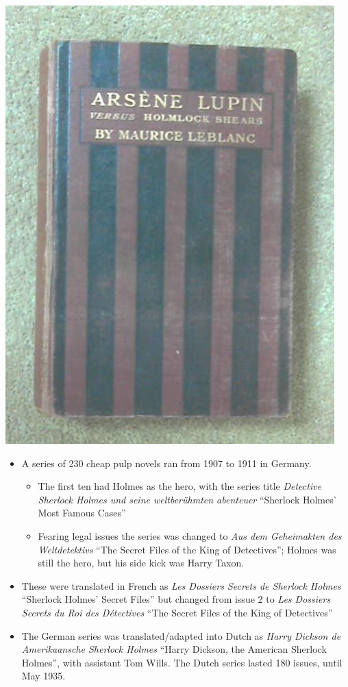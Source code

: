 \documentclass[a4paper,landscape,headrule,footrule,xetex]{foils}
\begin{document}
\includegraphics[height=0.7\textheight]{pics/lupi.jpg}



\begin{itemize}
\item A series of 230 cheap pulp novels ran from 1907 to 1911 in Germany.
  \begin{itemize}
  \item The first ten had Holmes as the hero, with the series title
    \textit{Detective Sherlock Holmes und seine weltberühmten
      abenteuer} ``Sherlock Holmes' Most Famous Cases''
  \item Fearing legal issues the series was changed to \textit{Aus dem
      Geheimakten des Weltdetektivs} ``The Secret Files of the King
      of Detectives''; Holmes was still the hero, but his side kick
      was Harry Taxon.
    \end{itemize}
  \item These were translated in French as \textit{Les Dossiers
      Secrets de Sherlock Holmes} ``Sherlock Holmes' Secret Files''
    but changed from issue 2 to \textit{Les Dossiers Secrets du Roi
      des Détectives} ``The Secret Files of the King of Detectives''
  \item The German series was translated/adapted into Dutch as
    \textit{Harry Dickson de Amerikaansche Sherlock Holmes} ``Harry
    Dickson, the American Sherlock Holmes'', with assistant Tom Wills.
    The Dutch series lasted 180 issues, until May 1935.
    
  \end{itemize}
\end{document}
